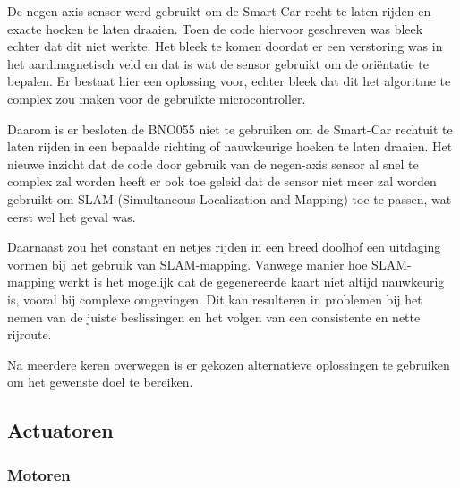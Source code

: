 De negen-axis sensor werd gebruikt om de \gls{Smart-Car} recht te laten rijden en exacte hoeken te laten draaien. Toen de code hiervoor geschreven was bleek echter dat dit niet werkte. Het bleek te komen doordat er een verstoring was in het aardmagnetisch veld en dat is wat de sensor gebruikt om de oriëntatie te bepalen. Er bestaat hier een oplossing voor, echter bleek dat dit het algoritme te complex zou maken voor de gebruikte microcontroller.

Daarom is er besloten de BNO055 niet te gebruiken om de \gls{Smart-Car} rechtuit te laten rijden in een bepaalde richting of nauwkeurige hoeken te laten draaien. Het nieuwe inzicht dat de code door gebruik van de negen-axis sensor al snel te complex zal worden heeft er ook toe geleid dat de sensor niet meer zal worden gebruikt om SLAM (Simultaneous Localization and Mapping) toe te passen, wat eerst wel het geval was. 

Daarnaast zou het constant en netjes rijden in een breed doolhof een uitdaging vormen bij het gebruik van SLAM-mapping. Vanwege manier hoe SLAM-mapping werkt is het mogelijk dat de gegenereerde kaart niet altijd nauwkeurig is, vooral bij complexe omgevingen. Dit kan resulteren in problemen bij het nemen van de juiste beslissingen en het volgen van een consistente en nette rijroute.

Na meerdere keren overwegen is er gekozen alternatieve oplossingen te gebruiken om het gewenste doel te bereiken. 

\subsection{Actuatoren}
\subsubsection{Motoren}

